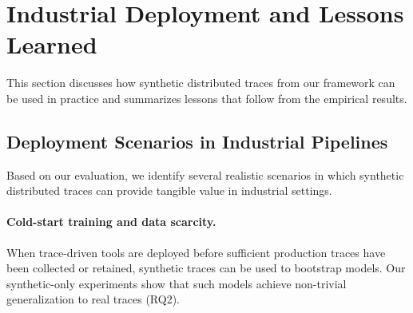 \documentclass[sigconf,review]{acmart}
\begin{document}


\section{Industrial Deployment and Lessons Learned}
\label{sec:industry}
This section discusses how synthetic distributed traces from our framework can be used in practice and summarizes lessons that follow from the empirical results.


\subsection{Deployment Scenarios in Industrial Pipelines}

Based on our evaluation, we identify several realistic scenarios in which synthetic distributed traces can provide tangible value in industrial settings.

\paragraph{Cold-start training and data scarcity.}
When trace-driven tools are deployed before sufficient production traces have been collected or retained, synthetic traces can be used to bootstrap models. Our synthetic-only experiments show that such models achieve non-trivial generalization to real traces (RQ2).
\end{document}
